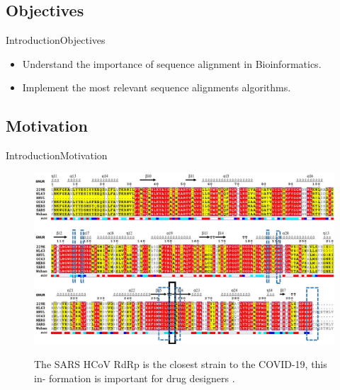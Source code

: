 \documentclass[10pt]{beamer}
\begin{document}
{\subsection{Objectives}

\begin{frame}{Introduction}{Objectives}
\begin{itemize}
    \item<1-> Understand the importance of sequence alignment in Bioinformatics. 
    \item<2-> Implement the most relevant sequence alignments algorithms.
  \end{itemize}
\end{frame}

\subsection{Motivation}

\begin{frame}{Introduction}{Motivation}
\begin{figure}[]
 \centering
    \includegraphics[width=\textwidth,height=0.6\textheight,keepaspectratio]{img/alignment/seq.jpg}
    \label{img:mot2}
    \caption{The SARS HCoV RdRp is the closest strain to the COVID-19, this in-
formation is important for drug designers \cite{elfiky2020anti}.}
\end{figure}
\end{frame}

}
\end{document}
